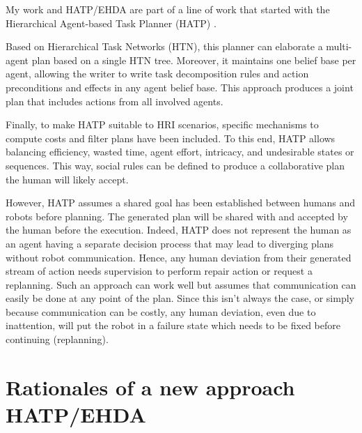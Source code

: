 My work and HATP/EHDA are part of a line of work that started with the Hierarchical Agent-based Task Planner (HATP) \cite{alili2009task,lallement2014hatp}.

Based on Hierarchical Task Networks (HTN), this planner can elaborate a multi-agent plan based on a single HTN tree. Moreover, it maintains one belief base per agent, allowing the writer to write task decomposition rules and action preconditions and effects in any agent belief base. This approach produces a joint plan that includes actions from all involved agents. 

Finally, to make HATP suitable to HRI scenarios, specific mechanisms to compute costs and filter plans have been included. To this end, HATP allows balancing efficiency, wasted time, agent effort, intricacy, and undesirable states or sequences. This way, social rules can be defined to produce a collaborative plan the human will likely accept. 

However, HATP assumes a shared goal has been established between humans and robots before planning. The generated plan will be shared with and accepted by the human before the execution. Indeed, HATP does not represent the human as an agent having a separate decision process that may lead to diverging plans without robot communication. Hence, any human deviation from their generated stream of action needs supervision to perform repair action or request a replanning. Such an approach can work well but assumes that communication can easily be done at any point of the plan. Since this isn't always the case, or simply because communication can be costly, any human deviation, even due to inattention, will put the robot in a failure state which needs to be fixed before continuing (replanning).

\section{Rationales of a new approach HATP/EHDA}

